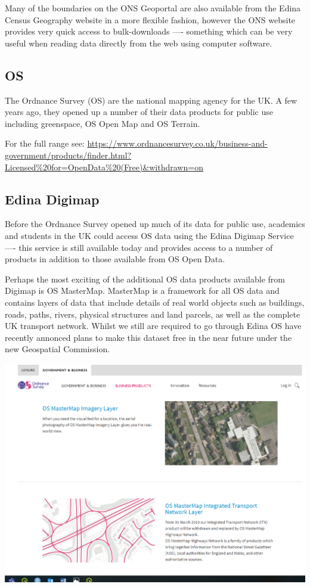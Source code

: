 \documentclass[]{book}
\begin{document}
Many of the boundaries on the ONS Geoportal are also available from the Edina Census Geography website in a more flexible fashion, however the ONS website provides very quick access to bulk-downloads ---- something which can be very useful when reading data directly from the web using computer software.

\hypertarget{os}{%
\subsection{OS}\label{os}}

The Ordnance Survey (OS) are the national mapping agency for the UK. A few years ago, they opened up a number of their data products for public use including greenspace, OS Open Map and OS Terrain.

For the full range see: \url{https://www.ordnancesurvey.co.uk/business-and-government/products/finder.html?Licensed\%20for=OpenData\%20(Free)\&withdrawn=on}

\hypertarget{edina-digimap}{%
\subsection{Edina Digimap}\label{edina-digimap}}

Before the Ordnance Survey opened up much of its data for public use, academics and students in the UK could access OS data using the Edina Digimap Service ---- this service is still available today and provides access to a number of products in addition to those available from OS Open Data.

Perhaps the most exciting of the additional OS data products available from Digimap is OS MasterMap. MasterMap is a framework for all OS data and contains layers of data that include details of real world objects such as buildings, roads, paths, rivers, physical structures and land parcels, as well as the complete UK transport network. Whilst we still are required to go through Edina OS have recently annonced plans to make this dataset free in the near future under the new Geospatial Commission.

\begin{center}\includegraphics[width=500pt]{prac1_images/mastermap} \end{center}
\end{document}
